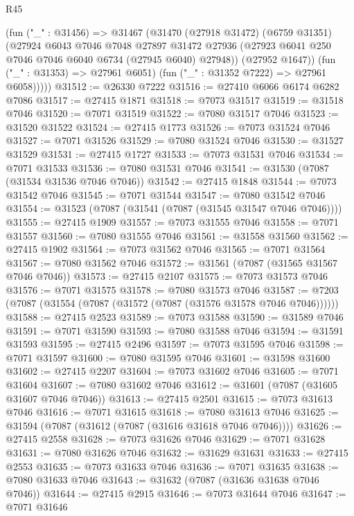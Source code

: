 \begin{lexlean}{R45}
\begin{coremodule}
{          (fun ("_" : @31456) =>
          @31467
            (@31470
              (@27918 @31472)
              (@6759 @31351)
              (@27924
                @6043
                @7046
                @7048
                @27897
                @31472
                @27936
                (@27923 @6041 @250 @7046 @7046 @6040 @6734 (@27945 @6040) @27948))
              (@27952 @1647))
            (fun ("_" : @31353) => @27961 @6051)
            (fun ("_" : @31352 @7222) => @27961 @6058)))))
@31512 := @26330 @7222
@31516 := @27410 @6066 @6174 @6282 @7086
@31517 := @27415 @1871
@31518 := @7073 @31517
@31519 := @31518 @7046
@31520 := @7071 @31519
@31522 := @7080 @31517 @7046
@31523 := @31520 @31522
@31524 := @27415 @1773
@31526 := @7073 @31524 @7046
@31527 := @7071 @31526
@31529 := @7080 @31524 @7046
@31530 := @31527 @31529
@31531 := @27415 @1727
@31533 := @7073 @31531 @7046
@31534 := @7071 @31533
@31536 := @7080 @31531 @7046
@31541 := @31530 (@7087 (@31534 @31536 @7046 @7046))
@31542 := @27415 @1848
@31544 := @7073 @31542 @7046
@31545 := @7071 @31544
@31547 := @7080 @31542 @7046
@31554 := @31523 (@7087 (@31541 (@7087 (@31545 @31547 @7046 @7046))))
@31555 := @27415 @1909
@31557 := @7073 @31555 @7046
@31558 := @7071 @31557
@31560 := @7080 @31555 @7046
@31561 := @31558 @31560
@31562 := @27415 @1902
@31564 := @7073 @31562 @7046
@31565 := @7071 @31564
@31567 := @7080 @31562 @7046
@31572 := @31561 (@7087 (@31565 @31567 @7046 @7046))
@31573 := @27415 @2107
@31575 := @7073 @31573 @7046
@31576 := @7071 @31575
@31578 := @7080 @31573 @7046
@31587 := @7203 (@7087 (@31554 (@7087 (@31572 (@7087 (@31576 @31578 @7046 @7046))))))
@31588 := @27415 @2523
@31589 := @7073 @31588
@31590 := @31589 @7046
@31591 := @7071 @31590
@31593 := @7080 @31588 @7046
@31594 := @31591 @31593
@31595 := @27415 @2496
@31597 := @7073 @31595 @7046
@31598 := @7071 @31597
@31600 := @7080 @31595 @7046
@31601 := @31598 @31600
@31602 := @27415 @2207
@31604 := @7073 @31602 @7046
@31605 := @7071 @31604
@31607 := @7080 @31602 @7046
@31612 := @31601 (@7087 (@31605 @31607 @7046 @7046))
@31613 := @27415 @2501
@31615 := @7073 @31613 @7046
@31616 := @7071 @31615
@31618 := @7080 @31613 @7046
@31625 := @31594 (@7087 (@31612 (@7087 (@31616 @31618 @7046 @7046))))
@31626 := @27415 @2558
@31628 := @7073 @31626 @7046
@31629 := @7071 @31628
@31631 := @7080 @31626 @7046
@31632 := @31629 @31631
@31633 := @27415 @2553
@31635 := @7073 @31633 @7046
@31636 := @7071 @31635
@31638 := @7080 @31633 @7046
@31643 := @31632 (@7087 (@31636 @31638 @7046 @7046))
@31644 := @27415 @2915
@31646 := @7073 @31644 @7046
@31647 := @7071 @31646
}
\end{coremodule}
\end{lexlean}
